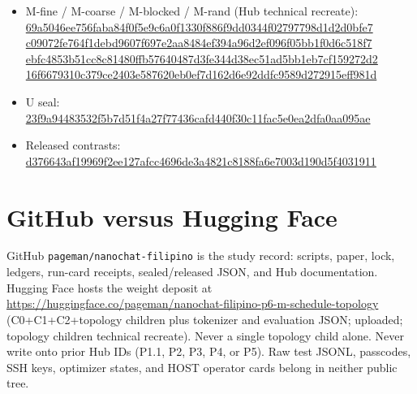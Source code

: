 \documentclass[11pt,a4paper]{article}
\newcommand{\sha}[1]{{\footnotesize\ttfamily\url{#1}}}
\begin{document}
\begin{itemize}[leftmargin=1.6em,itemsep=0.35em]
\sha{5ec45216eb0a09b5bc04f04f4622d85f7d8f7ff8861fdea6de5487f7c18fa526}\\
\sha{38580cd501c0d87a1a502397697f7c7e427134eb7cb64bdce2ba6be1a036f108}
\item M-fine / M-coarse / M-blocked / M-rand (Hub technical recreate):\\
\sha{69a5046ee756faba84f0f5e9c6a0f1330f886f9dd0344f02797798d1d2d0bfe7}\\
\sha{c09072fe764f1debd9607f697e2aa8484ef394a96d2ef096f05bb1f0d6c518f7}\\
\sha{ebfc4853b51cc8c81480ffb57640487d3fe344d38ec51ad5bb1eb7cf159272d2}\\
\sha{16f6679310c379ce2403e587620eb0ef7d162d6e92ddfc9589d272915eff981d}
\item U seal:\\
\sha{23f9a94483532f5b7d51f4a27f77436cafd440f30c11fac5e0ea2dfa0aa095ae}
\item Released contrasts:\\
\sha{d376643af19969f2ee127afcc4696de3a4821c8188fa6e7003d190d5f4031911}
\end{itemize}

\section{GitHub versus Hugging Face}
\label{app:split}
GitHub \texttt{pageman/nanochat-filipino} is the study record: scripts, paper, lock, ledgers, run-card receipts, sealed/released JSON, and Hub documentation. Hugging Face hosts the weight deposit at
\url{https://huggingface.co/pageman/nanochat-filipino-p6-m-schedule-topology}
(C0+C1+C2+topology children plus tokenizer and evaluation JSON; uploaded; topology children technical recreate). Never a single topology child alone. Never write onto prior Hub IDs (P1.1, P2, P3, P4, or P5). Raw test JSONL, passcodes, SSH keys, optimizer states, and HOST operator cards belong in neither public tree.
\end{document}
